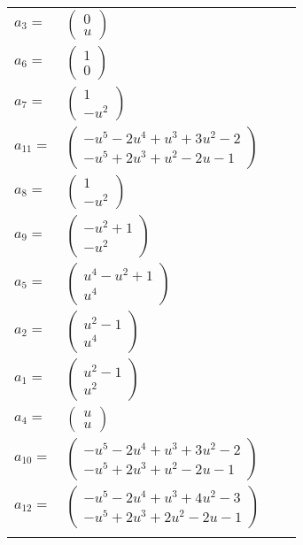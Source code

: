 \documentclass[1p]{elsarticle_modified}
\theoremstyle{definition}
\begin{document}
\begin{tabular}{m{7pt} m{180pt} m{7pt} m{180pt} }
\flushright $a_{3}=$&$\begin{pmatrix}0\\u\end{pmatrix}$ \\
\flushright $a_{6}=$&$\begin{pmatrix}1\\0\end{pmatrix}$ \\
\flushright $a_{7}=$&$\begin{pmatrix}1\\- u^2\end{pmatrix}$ \\
\flushright $a_{11}=$&$\begin{pmatrix}- u^5-2 u^4+u^3+3 u^2-2\\- u^5+2 u^3+u^2-2 u-1\end{pmatrix}$ \\
\flushright $a_{8}=$&$\begin{pmatrix}1\\- u^2\end{pmatrix}$ \\
\flushright $a_{9}=$&$\begin{pmatrix}- u^2+1\\- u^2\end{pmatrix}$ \\
\flushright $a_{5}=$&$\begin{pmatrix}u^4- u^2+1\\u^4\end{pmatrix}$ \\
\flushright $a_{2}=$&$\begin{pmatrix}u^2-1\\u^4\end{pmatrix}$ \\
\flushright $a_{1}=$&$\begin{pmatrix}u^2-1\\u^2\end{pmatrix}$ \\
\flushright $a_{4}=$&$\begin{pmatrix}u\\u\end{pmatrix}$ \\
\flushright $a_{10}=$&$\begin{pmatrix}- u^5-2 u^4+u^3+3 u^2-2\\- u^5+2 u^3+u^2-2 u-1\end{pmatrix}$ \\
\flushright $a_{12}=$&$\begin{pmatrix}- u^5-2 u^4+u^3+4 u^2-3\\- u^5+2 u^3+2 u^2-2 u-1\end{pmatrix}$\\&\end{tabular}
\end{document}
